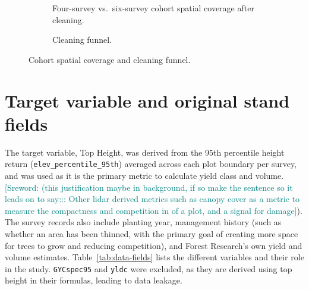 \documentclass[11pt,a4paper]{report}
\newcommand{\sr}[1]{\textcolor{teal}{[Sreword: #1]}}
\begin{document}
\begin{figure} [!htbp]
\begin{subfigure}[t]{0.55\textwidth}
\centering
{}
\caption{Four-survey vs.\ six-survey cohort spatial coverage after cleaning.}
\label{fig:data-cohort-map}
\end{subfigure}%
\hfill
\begin{subfigure}[t]{0.4\textwidth}
\centering
{}
\caption{Cleaning funnel.}
\label{fig:data-cohort-table}
\end{subfigure}
\caption{Cohort spatial coverage and cleaning funnel.}
\label{fig:data-cohort-coverage}
\end{figure}

\section{Target variable and original stand fields}
\label{sec:data-response}

The target variable, Top Height, was derived from the 95th percentile height return (\texttt{elev\_percentile\_95th}) averaged across each plot boundary per survey, and was used as it is the primary metric to calculate yield class and volume. \sr{(this justification maybe in background, if so make the sentence so it leads on to say::: Other lidar derived metrics such as canopy cover as a metric to measure the compactness and competition in of a plot, and a signal for damage}). The survey records also include planting year, management history (such as whether an area has been thinned, with the primary goal of creating more space for trees to grow and reducing competition), and Forest Research's own yield and volume estimates. Table~\ref{tab:data-fields} lists the different variables and their role in the study. \texttt{GYCspec95} and \texttt{yldc} were excluded, as they are derived using top height in their formulas, leading to data leakage.
\end{document}
